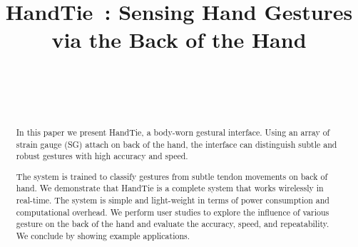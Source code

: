 \documentclass{sigchi}
\begin{document}
\newcommand{\getTitleName}{HandTie}

\title{\getTitleName\ : Sensing Hand Gestures via the Back of the Hand}

\author{%
  \\
  \\
  \\
}

\maketitle

\begin{abstract}
In this paper we present HandTie, a body-worn gestural interface. 
Using an array of strain gauge (SG) attach on back of the hand, 
the interface can distinguish subtle and robust gestures with high accuracy and speed. 

The system is trained to classify gestures from subtle tendon movements on back of hand. 
We demonstrate that HandTie is a complete system that works wirelessly in real-time. 
The system is simple and light-weight in terms of power consumption and computational overhead. 
We perform user studies to explore the influence of various gesture on the back of the hand and evaluate the accuracy, speed, and repeatability. 
We conclude by showing example applications.
\end{abstract}


 

\end{document}
